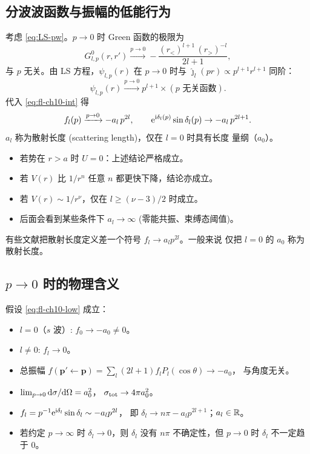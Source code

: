 \subsection{分波波函数与振幅的低能行为}

考虑 \eqref{eq:LS-pw}。$p\to0$ 时 Green 函数的极限为
\begin{equation}
G_{l,p}^{0}(r,r')\xrightarrow{p\to 0}
-\frac{(r_<)^{l+1}\,(r_>)^{-l}}{2l+1},
\end{equation}
与 $p$ 无关。由 LS 方程，$\psi_{l,p}(r)$ 在 $p\to0$ 时与
$\hat\jmath_l(pr)\propto p^{l+1}r^{l+1}$ 同阶：
\begin{equation}
\psi_{l,p}(r)\xrightarrow{p\to 0} p^{l+1}\times(\text{$p$ 无关函数}).
\end{equation}
代入 \eqref{eq:fl-ch10-int} 得
\begin{equation}\label{eq:fl-ch10-low}
f_l(p)\xrightarrow{p\to 0} -a_l\,p^{2l},\qquad
\mathrm{e}^{\mathrm{i}\delta_l(p)}\sin\delta_l(p)\to -a_l\,p^{2l+1}.
\end{equation}
$a_l$ 称为散射长度 (scattering length)，仅在 $l=0$ 时具有长度
量纲（$a_0$）。
\begin{itemize}
\item 若势在 $r>a$ 时 $U=0$：上述结论严格成立。
\item 若 $V(r)$ 比 $1/r^n$ 任意 $n$ 都更快下降，结论亦成立。
\item 若 $V(r)\sim 1/r^\nu$，仅在 $l\ge(\nu-3)/2$ 时成立。
\item 后面会看到某些条件下 $a_l\to\infty$ (零能共振、束缚态阈值)。
\end{itemize}
\begin{remark}
有些文献把散射长度定义差一个符号 $f_l\to a_l p^{2l}$。一般来说
仅把 $l=0$ 的 $a_0$ 称为散射长度。
\end{remark}

\subsection{$p\to0$ 时的物理含义}

假设 \eqref{eq:fl-ch10-low} 成立：
\begin{itemize}
\item $l=0$（$s$ 波）: $f_0\to -a_0\ne 0$。
\item $l\ne 0$: $f_l\to 0$。
\item 总振幅 $f(\mathbf p'\leftarrow\mathbf p)=\sum_l(2l+1)f_l P_l(\cos\theta)\to -a_0$，
  与角度无关。
\item $\lim_{p\to0}\mathrm{d}\sigma/\mathrm{d}\Omega = a_0^2$，
  $\sigma_{\rm tot}\to 4\pi a_0^2$。
\item $f_l=p^{-1}\mathrm{e}^{\mathrm{i}\delta_l}\sin\delta_l\sim -a_l p^{2l}$，
  即 $\delta_l\to n\pi-a_l p^{2l+1}$；$a_l\in\mathbb{R}$。
\item 若约定 $p\to\infty$ 时 $\delta_l\to0$，则 $\delta_l$ 没有
  $n\pi$ 不确定性，但 $p\to0$ 时 $\delta_l$ 不一定趋于 $0$。
\end{itemize}


